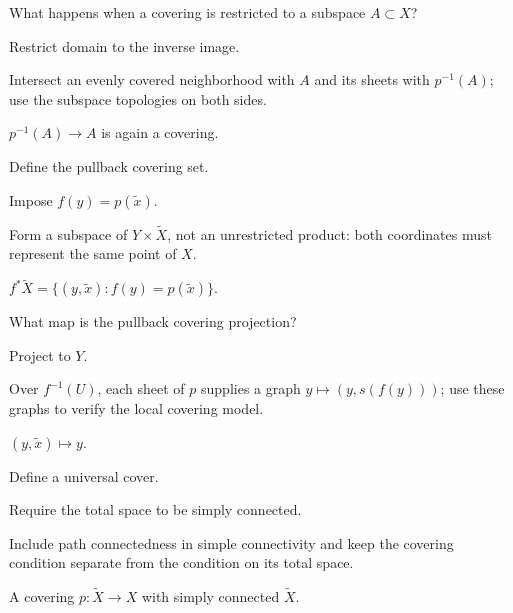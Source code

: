 \begin{exercise}\label{exr:viii10-13}
What happens when a covering is restricted to a subspace \(A\subset X\)?
\end{exercise}
\begin{hint}
Restrict domain to the inverse image.

Intersect an evenly covered neighborhood with \(A\) and its sheets with \(p^{-1}(A)\); use the subspace topologies on both sides.
\end{hint}
\begin{solution}
\(p^{-1}(A)\to A\) is again a covering.
\end{solution}

\begin{exercise}\label{exr:viii10-14}
Define the pullback covering set.
\end{exercise}
\begin{hint}
Impose \(f(y)=p(\tilde x)\).

Form a subspace of \(Y\times\widetilde X\), not an unrestricted product: both coordinates must represent the same point of \(X\).
\end{hint}
\begin{solution}
\(f^*\widetilde X=\{(y,\tilde x):f(y)=p(\tilde x)\}\).
\end{solution}

\begin{exercise}\label{exr:viii10-15}
What map is the pullback covering projection?
\end{exercise}
\begin{hint}
Project to \(Y\).

Over \(f^{-1}(U)\), each sheet of \(p\) supplies a graph \(y\mapsto(y,s(f(y)))\); use these graphs to verify the local covering model.
\end{hint}
\begin{solution}
\((y,\tilde x)\mapsto y\).
\end{solution}

\begin{exercise}\label{exr:viii10-16}
Define a universal cover.
\end{exercise}
\begin{hint}
Require the total space to be simply connected.

Include path connectedness in simple connectivity and keep the covering condition separate from the condition on its total space.
\end{hint}
\begin{solution}
A covering \(p:\widetilde X\to X\) with simply connected \(\widetilde X\).
\end{solution}

